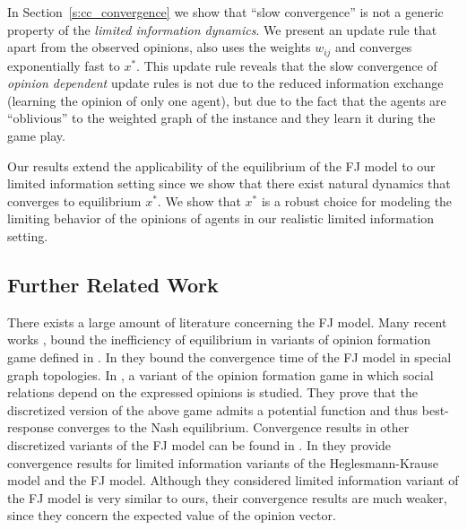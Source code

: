 In Section~\ref{s:cc_convergence} we show that \enquote{slow convergence} is
not a generic property of the \emph{limited information dynamics}.  We present
an update rule that apart from the observed opinions, also uses the weights
$w_{ij}$ and converges exponentially fast to $x^*$.
This update rule reveals that the slow convergence of \emph{opinion dependent}
update rules is not due to the reduced information exchange (learning the opinion
of only one agent), but due to the fact that the agents are \enquote{oblivious}
to the weighted graph of the instance and they learn it during the game play.

Our results extend the applicability of the equilibrium of the FJ model to our
limited information setting since we show that there exist natural dynamics
that converges to equilibrium $x^*$. We show that $x^*$ is a robust choice for
modeling the limiting behavior of the opinions of agents in our realistic
limited information setting.

\subsection{Further Related Work}

There exists a large amount of literature concerning the FJ model.  Many recent
works \cite{BGM13,CKO13}, \cite{BFM16,EFHS17} bound the inefficiency of
equilibrium in variants of opinion formation game defined in \cite{BKO11}. In
\cite{GS14} they bound the convergence time of the FJ model in special graph
topologies.  In \cite{BFM16}, a variant of the opinion formation game in which
social relations depend on the expressed opinions is studied.  They prove that
the discretized version of the above game admits a potential function and thus
best-response converges to the Nash equilibrium.  Convergence results in other
discretized variants of the FJ model can be found in \cite{YOASS13,FGV16}. In
\cite{FPS16} they provide convergence results for limited information variants
of the Heglesmann-Krause model \cite{HK} and the FJ model. Although they
considered limited information variant of the FJ model is very similar to ours,
their convergence results are much weaker, since they concern the expected
value of the opinion vector.

